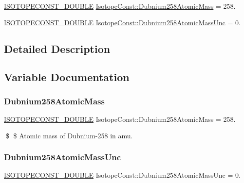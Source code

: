 \begin{DoxyCompactItemize}
\item 
\mbox{\hyperlink{group___isotope_const-_macros_ga8f45a7272ce02c0b4c65c44636ed719a}{I\+S\+O\+T\+O\+P\+E\+C\+O\+N\+S\+T\+\_\+\+D\+O\+U\+B\+LE}} \mbox{\hyperlink{group___isotope_const-_dubnium-_db258_gad3bfa03ad5c91058f4f19ed53a5245ce}{Isotope\+Const\+::\+Dubnium258\+Atomic\+Mass}} = 258.
\item 
\mbox{\hyperlink{group___isotope_const-_macros_ga8f45a7272ce02c0b4c65c44636ed719a}{I\+S\+O\+T\+O\+P\+E\+C\+O\+N\+S\+T\+\_\+\+D\+O\+U\+B\+LE}} \mbox{\hyperlink{group___isotope_const-_dubnium-_db258_ga7b9e259ed83452c88477b30e3f9c5627}{Isotope\+Const\+::\+Dubnium258\+Atomic\+Mass\+Unc}} = 0.
\end{DoxyCompactItemize}


\subsection{Detailed Description}


\subsection{Variable Documentation}
\mbox{\label{group___isotope_const-_dubnium-_db258_gad3bfa03ad5c91058f4f19ed53a5245ce}} 
\subsubsection{\texorpdfstring{Dubnium258\+Atomic\+Mass}{Dubnium258AtomicMass}}
{\footnotesize\ttfamily \mbox{\hyperlink{group___isotope_const-_macros_ga8f45a7272ce02c0b4c65c44636ed719a}{I\+S\+O\+T\+O\+P\+E\+C\+O\+N\+S\+T\+\_\+\+D\+O\+U\+B\+LE}} Isotope\+Const\+::\+Dubnium258\+Atomic\+Mass = 258.}

\$ \$ Atomic mass of Dubnium-\/258 in amu. \mbox{\label{group___isotope_const-_dubnium-_db258_ga7b9e259ed83452c88477b30e3f9c5627}} 
\subsubsection{\texorpdfstring{Dubnium258\+Atomic\+Mass\+Unc}{Dubnium258AtomicMassUnc}}
{\footnotesize\ttfamily \mbox{\hyperlink{group___isotope_const-_macros_ga8f45a7272ce02c0b4c65c44636ed719a}{I\+S\+O\+T\+O\+P\+E\+C\+O\+N\+S\+T\+\_\+\+D\+O\+U\+B\+LE}} Isotope\+Const\+::\+Dubnium258\+Atomic\+Mass\+Unc = 0.}

